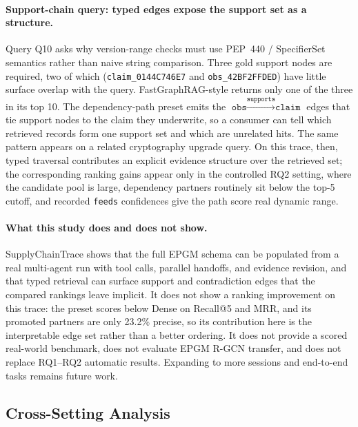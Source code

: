 \paragraph{Support-chain query: typed edges expose the support set as a
structure.}
Query Q10 asks why version-range checks must use PEP~440 / SpecifierSet
semantics rather than naive string comparison. Three gold support nodes
are required, two of which (\texttt{claim\_0144C746E7} and
\texttt{obs\_42BF2FFDED}) have little surface overlap with the query.
FastGraphRAG-style returns only one of the three in its top 10. The
dependency-path preset emits the
$\texttt{obs}\xrightarrow{\texttt{supports}}\texttt{claim}$ edges that tie
support nodes to the claim they underwrite, so a consumer can tell which
retrieved records form one support set and which are unrelated hits. The same
pattern appears on a related cryptography upgrade query. On this trace, then,
typed traversal contributes an explicit evidence structure over the retrieved
set; the corresponding ranking gains appear only in the controlled RQ2
setting, where the candidate pool is large, dependency partners routinely sit
below the top-5 cutoff, and recorded \texttt{feeds} confidences give the path
score real dynamic range.

\paragraph{What this study does and does not show.}
SupplyChainTrace shows that the full EPGM schema can be populated from a
real multi-agent run with tool calls, parallel handoffs, and evidence
revision, and that typed retrieval can surface support and contradiction
edges that the compared rankings leave implicit. It does not show a ranking
improvement on this trace: the preset scores below Dense on Recall@5 and MRR,
and its promoted partners are only 23.2\% precise, so its contribution here is
the interpretable edge set rather than a better ordering. It does not provide
a scored real-world benchmark, does not evaluate EPGM R-GCN transfer, and does
not replace RQ1--RQ2 automatic results. Expanding to more sessions and
end-to-end tasks remains future work.

\subsection{Cross-Setting Analysis}

